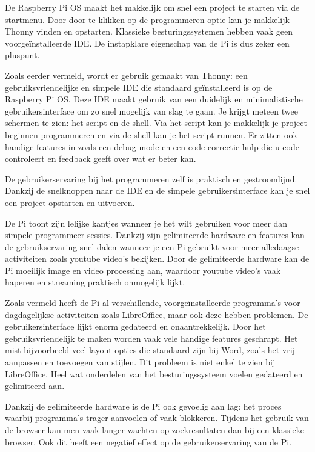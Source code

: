 De Raspberry Pi OS maakt het makkelijk om snel een project te starten via de startmenu. Door door te klikken op de programmeren optie kan je makkelijk Thonny vinden en opstarten. Klassieke besturingssystemen hebben vaak geen voorgeïnstalleerde IDE. De instapklare eigenschap van de Pi is dus zeker een pluspunt. 

Zoals eerder vermeld, wordt er gebruik gemaakt van Thonny: een gebruiksvriendelijke en simpele IDE die standaard geïnstalleerd is op de Raspberry Pi OS. Deze IDE maakt gebruik van een duidelijk en minimalistische gebruikersinterface om zo snel mogelijk van slag te gaan. Je krijgt meteen twee schermen te zien: het script en de shell. Via het script kan je makkelijk je project beginnen programmeren en via de shell kan je het script runnen. Er zitten ook handige features in zoals een debug mode en een code correctie hulp die u code controleert en feedback geeft over wat er beter kan. 

De gebruikerservaring bij het programmeren zelf is praktisch en gestroomlijnd. Dankzij de snelknoppen naar de IDE en de simpele gebruikersinterface kan je snel een project opstarten en uitvoeren.


De Pi toont zijn lelijke kantjes wanneer je het wilt gebruiken voor meer dan simpele programmeer sessies. Dankzij zijn gelimiteerde hardware en features kan de gebruikservaring snel dalen wanneer je een Pi gebruikt voor meer alledaagse activiteiten zoals youtube video’s bekijken. Door de gelimiteerde hardware kan de Pi moeilijk image en video processing aan, waardoor youtube video’s vaak haperen en streaming praktisch onmogelijk lijkt.

Zoals vermeld heeft de Pi al verschillende, voorgeïnstalleerde programma’s voor dagdagelijkse activiteiten zoals LibreOffice, maar ook deze hebben problemen. De gebruikersinterface lijkt enorm gedateerd en onaantrekkelijk. Door het gebruiksvriendelijk te maken worden vaak vele handige features geschrapt. Het mist bijvoorbeeld veel layout opties die standaard zijn bij Word, zoals het vrij aanpassen en toevoegen van stijlen. 
Dit probleem is niet enkel te zien bij LibreOffice. Heel wat onderdelen van het besturingssysteem voelen gedateerd en gelimiteerd aan. 

Dankzij de gelimiteerde hardware is de Pi ook gevoelig aan lag: het proces waarbij programma's trager aanvoelen of vaak blokkeren. Tijdens het gebruik van de browser kan men vaak langer wachten op zoekresultaten dan bij een klassieke browser. Ook dit heeft een negatief effect op de gebruikerservaring van de Pi.

